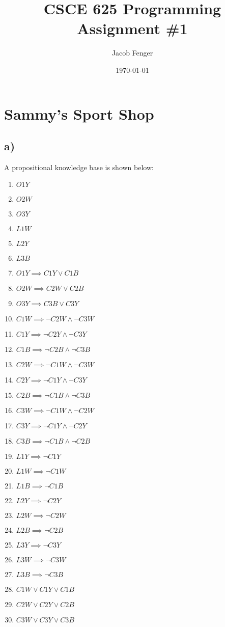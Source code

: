\documentclass[22pt]{article}
\begin{document}
\title{CSCE 625 Programming Assignment \#1}
\author{Jacob Fenger}
\date{\today}
\maketitle

\section{Sammy's Sport Shop}
\subsection*{a)}
A propositional knowledge base is shown below:

\begin{multicols}{2}
\begin{enumerate}
	\item $O1Y$
	\item $O2W$
	\item $O3Y$
	\item $L1W$
	\item $L2Y$
	\item $L3B$
	\item $O1Y \implies C1Y \lor C1B$ 
	\item $O2W \implies C2W \lor C2B$
	\item $O3Y \implies C3B \lor C3Y$
	\item $C1W \implies \neg C2W \land \neg C3W$
	\item $C1Y \implies \neg C2Y \land \neg C3Y$
	\item $C1B \implies \neg C2B \land \neg C3B$
	\item $C2W \implies \neg C1W \land \neg C3W$
	\item $C2Y \implies \neg C1Y \land \neg C3Y$
	\item $C2B \implies \neg C1B \land \neg C3B$
	\item $C3W \implies \neg C1W \land \neg C2W$
	\item $C3Y \implies \neg C1Y \land \neg C2Y$
	\item $C3B \implies \neg C1B \land \neg C2B$
	\item $L1Y \implies \neg C1Y$
	\item $L1W \implies \neg C1W$
	\item $L1B \implies \neg C1B$
	\item $L2Y \implies \neg C2Y$
	\item $L2W \implies \neg C2W$
	\item $L2B \implies \neg C2B$
	\item $L3Y \implies \neg C3Y$
	\item $L3W \implies \neg C3W$
	\item $L3B \implies \neg C3B$
	\item $C1W \lor C1Y \lor C1B$
	\item $C2W \lor C2Y \lor C2B$
	\item $C3W \lor C3Y \lor C3B$
\end{enumerate}
\end{multicols}
\end{document}
